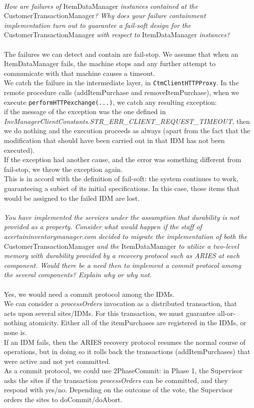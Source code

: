 \documentclass[paper=a4, fontsize=11pt]{scrartcl} %
\numberwithin{equation}{section} %
\numberwithin{figure}{section} %
\numberwithin{table}{section} %
\begin{document}
~\\
\textit{How are failures of }ItemDataManager\textit{ instances contained at the}
CustomerTransactionManager\textit{? Why does your failure containment implementation turn}
\textit{out to guarantee a fail-soft design for the }CustomerTransactionManager\textit{ with respect to}
ItemDataManager\textit{ instances?}\\
~\\
The failures we can detect and contain are fail-stop. We assume that when an ItemDataManager fails, the machine stops and any further attempt to communicate with that machine causes a timeout.\\
We catch the failure in the intermediate layer, in \verb|CtmClientHTTPProxy|. In the remote procedure calls (addItemPurchase and removeItemPurchase), when we execute \verb|performHTTPexchange(...)|, we catch any resulting exception:\\
if the message of the exception was the one defined in \\
\textit{InvManagerClientConstants.STR\_ERR\_CLIENT\_REQUEST\_TIMEOUT}, then we do nothing and the execution proceeds as always (apart from the fact that the modification that should have been carried out in that IDM has not been executed). \\
If the exception had another cause, and the error was something different from fail-stop, we throw the exception again.\\
This is in accord with the definition of fail-soft: the system continues to work, guaranteeing a subset of its initial specifications. In this case, those items that would be assigned to the failed IDM are lost.\\
~\\
\textit{You have implemented the services under the assumption that durability is not provided as a
property. Consider what would happen if the staff of acertaininventorymanager.com
decided to migrate the implementation of both the }CustomerTransactionManager\textit{ and 
the }ItemDataManager\textit{ to utilize a two-level memory with durability provided by a recovery
protocol such as ARIES at each component. Would there be a need then to implement a commit
protocol among the several components? Explain why or why not.}\\
~\\
Yes, we would need a commit protocol among the IDMs.\\
We can consider a \textit{processOrders} invocation as a distributed transaction, that acts upon several sites/IDMs. For this transaction, we must guarantee all-or-nothing atomicity. Either all of the itemPurchases are registered in the IDMs, or none is.\\
If an IDM fails, then the ARIES recovery protocol resumes the normal course of operations, but in doing so it rolls back the transactions (addItemPurchases) that were active and not yet committed.\\
As a commit protocol, we could use 2PhaseCommit: in Phase 1, the Supervisor asks the sites if the transaction \textit{processOrders} can be committed, and they respond with yes/no. Depending on the outcome of the vote, the Supervisor orders the sites to doCommit/doAbort.\\
\end{document}
